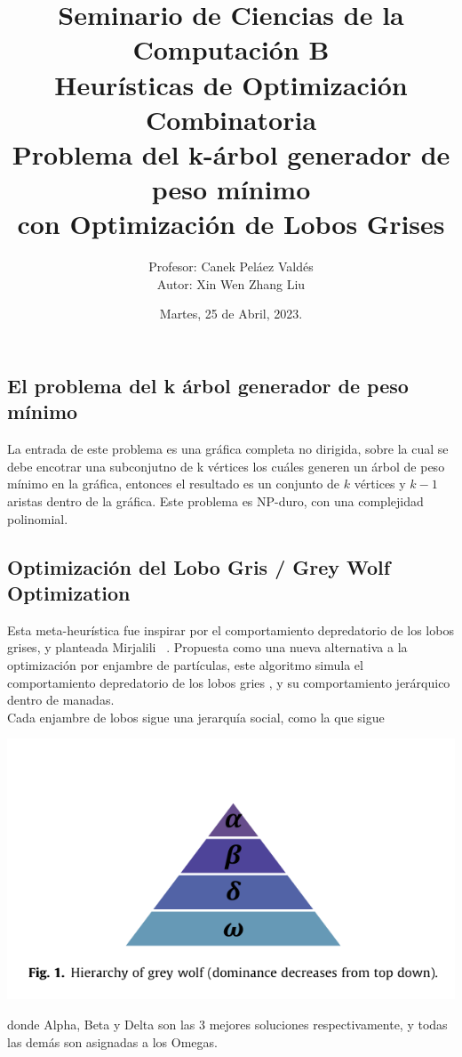 \documentclass[a4paper]{report}
\title { \Large{Seminario de Ciencias de la Computaci\'on B}\protect\\
  \large{Heurísticas de Optimización Combinatoria}\protect\\
  \large{Problema del k-\'arbol generador de peso m\'inimo\\con Optimización de Lobos Grises}}
\date{\normalsize{Martes, 25 de Abril, 2023.}}
\author{\normalsize{Profesor: Canek Peláez Valdés}\protect\\
  \normalsize{Autor: Xin Wen Zhang Liu}}\vspace{0.2cm}
\begin{document}
\allowdisplaybreaks
\maketitle

\subsection*{El problema del k \'arbol generador de peso m\'inimo}
La entrada de este problema es una gr\'afica completa no dirigida, sobre la cual se debe encotrar una subconjutno de k v\'ertices los cu\'ales generen un \'arbol de peso m\'inimo en la gr\'afica, entonces el resultado es un conjunto de $k$ v\'ertices y $k-1$ aristas dentro de la gr\'afica. Este problema es NP-duro, con una complejidad polinomial.


\subsection*{Optimizaci\'on del Lobo Gris / Grey Wolf Optimization}
Esta meta-heur\'istica fue inspirar por el comportamiento depredatorio de los lobos grises, y planteada Mirjalili
~\cite{MIRJALILI201446}. Propuesta como una nueva alternativa a la optimización por enjambre de
part\'iculas, este algoritmo simula el comportamiento depredatorio de los lobos gries , y su comportamiento jer\'arquico dentro de manadas.\\

Cada enjambre de lobos sigue una jerarqu\'ia social, como la que sigue
\begin{center}
  \includegraphics[width=\textwidth]{1682483544.png}
\end{center}

donde Alpha, Beta y Delta son las 3 mejores soluciones respectivamente, y todas las dem\'as son asignadas a los Omegas.
\end{document}
